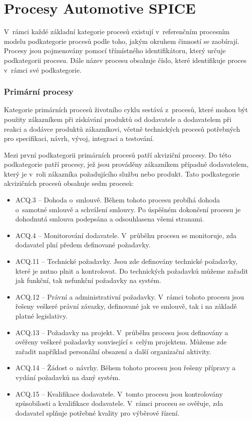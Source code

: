 \documentclass[czech,master]{diploma}
\begin{document}
\chapter{Procesy Automotive SPICE}
\label{sec:aspice_processes_apendix}
V~rámci každé základní kategorie procesů existují v~referenčním procesním modelu podkategorie procesů podle toho, jakým okruhem činností se zaobírají. Procesy jsou pojmenovány pomocí třímístného identifikátoru, který určuje podkategorii procesu. Dále název procesu obsahuje číslo, které identifikuje proces v~rámci své podkategorie.

\subsection{Primární procesy}
Kategorie primárních procesů životního cyklu sestává z~procesů, které mohou být použity zákazníkem při získávání produktů od dodavatele a dodavatelem při reakci a dodávce produktů zákazníkovi, včetně technických procesů potřebných pro specifikaci, návrh, vývoj, integraci a testování.

Mezi první podkategorii primárních procesů patří akviziční procesy. Do této podkategorie patří procesy, jež jsou prováděny zákazníkem případně dodavatelem, který je v~roli zákazníka požadujícího službu nebo produkt. Tato podkategorie akvizičních procesů obsahuje sedm procesů:

\begin{itemize}
\item ACQ.3 -- Dohoda o~smlouvě. Během tohoto procesu probíhá dohoda o~samotné smlouvě a schválení smlouvy. Po úspěšném dokončení procesu je dohodnutá smlouva podepsána a odsouhlasena všemi stranami.
\item ACQ.4 -- Monitorování dodavatele. V~průběhu procesu se monitoruje, zda dodavatel plní předem definované požadavky.
\item ACQ.11 -- Technické požadavky. Jsou zde definovány technické požadavky, které je nutno plnit a kontrolovat. Do technických požadavků můžeme zařadit jak funkční, tak nefunkční požadavky na systém.
\item ACQ.12 -- Právní a administrativní požadavky. V~rámci tohoto procesu jsou řešeny veškeré právní závazky, definované jak ve smlouvě, tak i  na základě platné legislativy.
\item ACQ.13 -- Požadavky na projekt. V~průběhu procesu jsou definovány a ověřeny veškeré požadavky související s~celým projektem. Můžeme zde zařadit například personální obsazení a další organizační aktivity.
\item ACQ.14 -- Žádost o~návrhy.  Během tohoto procesu jsou řešeny přípravy a vydání požadavků na daný systém.
\item ACQ.15 -- Kvalifikace dodavatele. V~tomto procesu jsou kontrolovány způsobilosti a kvalifikace dodavatele. V~rámci procesu se ověřuje, zda dodavatel splňuje potřebné kvality pro výběrové řízení.
\end{itemize}
\end{document}
